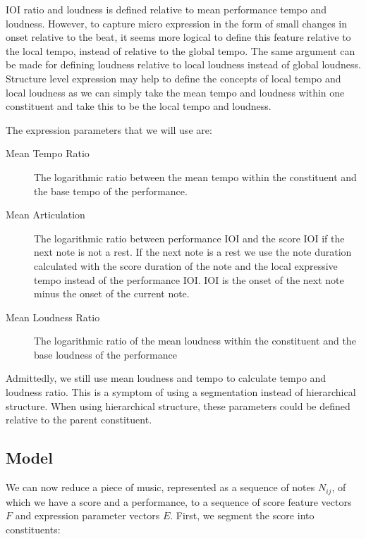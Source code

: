 \documentclass[a4paper,10pt]{article}
\begin{document}
IOI ratio and loudness is defined relative to mean performance tempo and loudness. However, to capture micro expression in the form of small changes in onset relative to the beat, it seems more logical to define this feature relative to the local tempo, instead of relative to the global tempo. The same argument can be made for defining loudness relative to local loudness instead of global loudness. Structure level expression may help to define the concepts of local tempo and local loudness as we can simply take the mean tempo and loudness within one constituent and take this to be the local tempo and loudness.

The expression parameters that we will use are:
\begin{description}
\item[Mean Tempo Ratio] The logarithmic ratio between the mean tempo within the constituent and the base tempo of the performance.
\item[Mean Articulation] The logarithmic ratio between performance IOI and the score IOI if the next note is not a rest. If the next note is a rest we use the note duration calculated with the score duration of the note and the local expressive tempo instead of the performance IOI. IOI is the onset of the next note minus the onset of the current note.
\item[Mean Loudness Ratio] The logarithmic ratio of the mean loudness within the constituent and the base loudness of the performance
\end{description}

Admittedly, we still use mean loudness and tempo to calculate tempo and loudness ratio. This is a symptom of using a segmentation instead of hierarchical structure. When using hierarchical structure, these parameters could be defined relative to the parent constituent.

\subsection{Model}
\label{sec:model}


We can now reduce a piece of music, represented as a sequence of notes $N_{ij}$, of which we have a score and a performance, to a sequence of score feature vectors $F$ and expression parameter vectors $E$. First, we segment the score into constituents:
\end{document}

